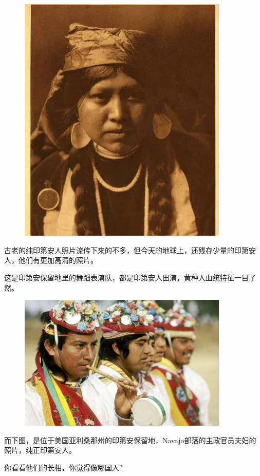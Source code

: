 \documentclass[UTF8, 11pt, oneside]{ctexart}
\begin{document}
\begin{figure}[H]
    \centering
    \includegraphics[width=10cm]{2023-10-13-003}
\end{figure}

古老的纯印第安人照片流传下来的不多，但今天的地球上，还残存少量的印第安人，他们有更加高清的照片。

这是印第安保留地里的舞蹈表演队，都是印第安人出演，黄种人血统特征一目了然。

\begin{figure}[H]
    \centering
    \includegraphics[width=10cm]{2023-10-13-004}
\end{figure}

而下图，是位于美国亚利桑那州的印第安保留地，Navajo部落的主政官员夫妇的照片，纯正印第安人。

你看看他们的长相，你觉得像哪国人?
\end{document}
